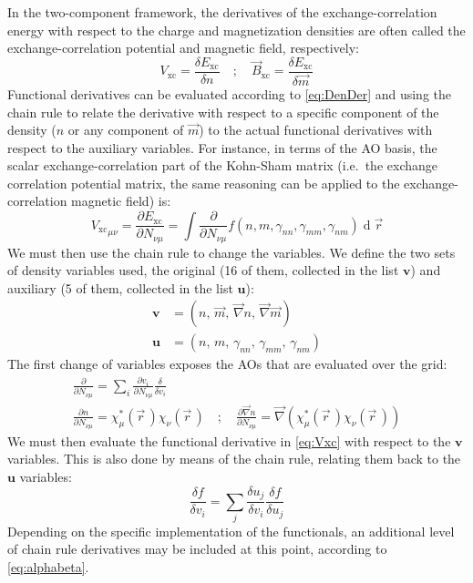 \documentclass[12pt]{article}
\newcommand{\dd}{\operatorname{d}}
\newcommand*{\grad}{\vec{\nabla}}
\newcommand*{\pder}[2]{\frac{\partial #1}{\partial #2}}
\newcommand*{\dder}[2]{\frac{\delta #1}{\delta #2}}
\begin{document}
In the two-component framework, the derivatives of the exchange-correlation energy with respect to the charge and magnetization densities are often called the exchange-correlation potential and magnetic field, respectively:\cite{Gyorffy01_206403,Scuseria13_035117}
\begin{equation}
 V_\mathrm{xc} = \dder{E_\mathrm{xc}}{n} \quad;\quad \vec{B}_\mathrm{xc} = \dder{E_\mathrm{xc}}{\vec{m}}
\end{equation}
Functional derivatives can be evaluated according to \cref{eq:DenDer} and using the chain rule to relate the derivative with respect to a specific component of the density ($n$ or any component of $\vec{m}$) to the actual functional derivatives with respect to the auxiliary variables.
For instance, in terms of the AO basis, the scalar exchange-correlation part of the Kohn-Sham matrix (i.e.\ the exchange correlation potential matrix, the same reasoning can be applied to the exchange-correlation magnetic field) is:
\begin{equation}
\label{eq:Vxc}
 {V_\mathrm{xc}}_{\mu\nu} = \pder{E_\mathrm{xc}}{N_{\nu\mu}} = \int \pder{}{N_{\nu\mu}}f(n,m,\gamma_{nn},\gamma_{mm},\gamma_{nm})\dd\vec{r}
\end{equation}
We must then use the chain rule to change the variables.
We define the two sets of density variables used, the original (16 of them, collected in the list $\bm{v}$) and auxiliary (5 of them, collected in the list $\bm{u}$):
\begin{align}
 \bm{v} &= ( n ,\,\vec{m} ,\, \grad n ,\, \grad\vec{m} ) \\
 \bm{u} &= ( n ,\, m ,\, \gamma_{nn} ,\, \gamma_{mm} ,\, \gamma_{nm} ) 
\end{align}
The first change of variables exposes the AOs that are evaluated over the grid:
\begin{gather}
 \pder{}{N_{\nu\mu}} = \sum_i \pder{v_i}{N_{\nu\mu}}\dder{}{v_i} \\
 \pder{n}{N_{\nu\mu}} = \chi^*_\mu(\vec{r}\,)\chi_\nu(\vec{r}\,) \quad;\quad
 \pder{\grad n}{N_{\nu\mu}} = \grad(\chi^*_\mu(\vec{r}\,)\chi_\nu(\vec{r}\,))
\end{gather}
We must then evaluate the functional derivative in \cref{eq:Vxc} with respect to the $\bm{v}$ variables.
This is also done by means of the chain rule, relating them back to the $\bm{u}$ variables:
\begin{equation}
 \dder{f}{v_i} = \sum_j \dder{u_j}{v_i}\dder{f}{u_j}
\end{equation}
Depending on the specific implementation of the functionals, an additional level of chain rule derivatives may be included at this point, according to \cref{eq:alphabeta}.
\iffalse
Some chain rule derivatives are trivial, we collect here some less immediate ones:
\begin{gather*}
 \dder{m}{\vec{m}} = \frac{\vec{m}}{m} \quad;\quad
 \dder{\gamma_{nn}}{\grad n} = 2\grad n \quad;\quad
 \dder{\gamma_{mm}}{\grad\vec{m}} = 2\grad \vec{m} \\
 \dder{\gamma_{nm}}{\grad n} = f_\nabla\sqrt{(\grad n \cdot \grad\vec{m})\circ\grad\vec{m}} \quad;\quad
 \dder{\gamma_{nm}}{\grad \vec{m}} = f_\nabla\sqrt{(\grad n \cdot \grad\vec{m}) \grad n}
\end{gather*}
\fi
\end{document}
